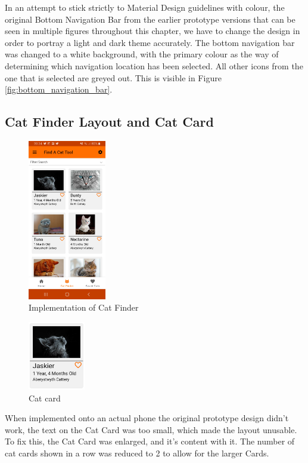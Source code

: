In an attempt to stick strictly to Material Design guidelines with colour, the original \gls{Bottom Navigation Bar} from the earlier prototype versions that can be seen in multiple figures throughout this chapter, we have to change the design in order to portray a light and dark theme accurately. The bottom navigation bar was changed to a white background, with the primary colour as the way of determining which navigation location has been selected. All other icons from the one that is selected are greyed out. This is visible in Figure \ref{fig:bottom_navigation_bar}.

\subsection{Cat Finder Layout and Cat Card}

\begin{figure} [htbp!]
    \centering
    \includegraphics[height=7cm]{Images/CatFinderScreen.jpg}
    \caption{Implementation of Cat Finder}
    \label{fig:cat_finder}
\end{figure}

\begin{figure} [htbp!]
    \centering
    \includegraphics[height=3cm]{Images/CatCard.png}
    \caption{Cat card}
    \label{fig:cat_card}
\end{figure}

When implemented onto an actual phone the original prototype design didn't work, the text on the Cat \gls{Card} was too small, which made the layout unusable. To fix this, the Cat Card was enlarged, and it's content with it. The number of cat cards shown in a row was reduced to 2 to allow for the larger \gls{Card}s.

